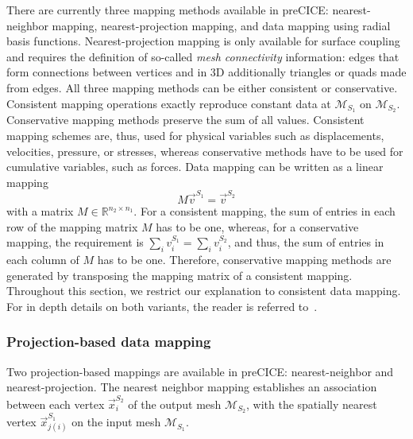 There are currently three mapping methods available in preCICE: nearest-neighbor mapping, nearest-projection mapping, and data mapping using radial basis functions. Nearest-projection mapping is only available for surface coupling and requires the definition of so-called \textit{mesh connectivity} information: edges that form connections between vertices and in 3D additionally triangles or quads made from edges.
All three mapping methods can be either consistent or conservative. Consistent mapping operations exactly reproduce constant data at $\mathcal{M}_{S_1}$ on $\mathcal{M}_{S_2}$. Conservative mapping methods preserve the sum of all values. Consistent mapping schemes are, thus, used for physical variables such as displacements, velocities, pressure, or stresses, whereas conservative methods have to be used for cumulative variables, such as forces. 
Data mapping can be written as a linear mapping
\[ M \vec{v}^{S_1} = \vec{v}^{S_2} \]
with a matrix $M \in \mathbb{R}^{n_2 \times n_1}$. For a consistent mapping, the sum of entries in each row of the mapping matrix $M$ has to be one, whereas, for a conservative mapping, the requirement is $\sum_i v_i^ {S_1} = \sum_i v_i^{S_2}$, and thus, the sum of entries in each column of $M$ has to be one. Therefore, conservative mapping methods are generated by transposing the 
mapping matrix of a consistent mapping.  
Throughout this section, we restrict our explanation to consistent data mapping.  
For in depth details on both variants, the reader is referred to~\cite{DeBoer2008_ComparisonMapping, Gatzhammer2015, Lindner2019}.

\subsubsection{Projection-based data mapping}
\label{map:projectionMethods}

Two projection-based mappings are available in preCICE: nearest-neighbor and nearest-projection. 
The nearest neighbor mapping establishes an association between each vertex $\vec{x}_i^{S_2}$ of the output mesh $\mathcal{M}_{S_2}$, with the spatially nearest vertex $\vec{x}_{j(i)}^{S_1}$ on the input mesh $\mathcal{M}_{S_1}$.

